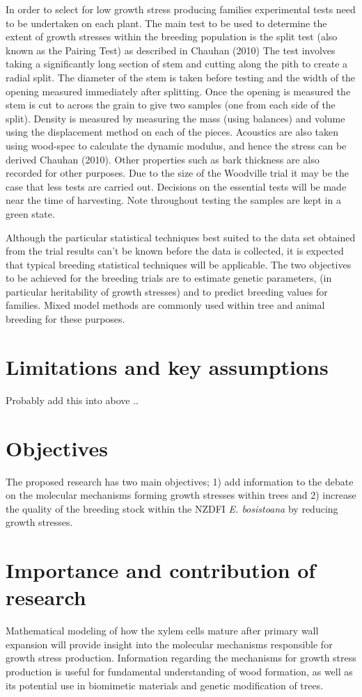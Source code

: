 \documentclass{article}
\begin{document}
In order to select for low growth stress producing families experimental tests
need to be undertaken on each plant. The main test to be used to determine the
extent of growth stresses within the breeding population is the split test (also
known as the Pairing Test) as described in Chauhan (2010) The test involves
taking a significantly long section of stem and cutting along the pith to create
a radial split. The diameter of the stem is taken before testing and the width
of the opening measured immediately after splitting. Once the opening is
measured the stem is cut to across the grain to give two samples (one from each
side of the split). Density is measured by measuring the mass (using balances)
and volume using the displacement method on each of the pieces. Acoustics are
also taken using wood-spec to calculate the dynamic modulus, and hence the
stress can be derived Chauhan (2010). Other properties such as bark thickness
are also recorded for other purposes. Due to the size of the Woodville trial it
may be the case that less tests are carried out. Decisions on the essential
tests will be made near the time of harvesting. Note throughout testing the
samples are kept in a green state.

Although the particular statistical techniques best suited to the data set
obtained from the trial results can’t be known before the data is collected, it
is expected that typical breeding statistical techniques will be applicable. The
two objectives to be achieved for the breeding trials are to estimate genetic
parameters, (in particular heritability of growth stresses) and to predict
breeding values for families. Mixed model methods are commonly used within tree
and animal breeding for these purposes.

\section{Limitations and key assumptions}
Probably add this into above ..

\section{Objectives}
The proposed research has two main objectives; 1) add information to the
debate on the molecular mechanisms forming growth stresses within trees and 2)
increase the quality of the breeding stock within the NZDFI \textit{E.
bosistoana} by reducing growth stresses.

\section{Importance and contribution of research}
Mathematical modeling of how the xylem cells mature after primary
wall expansion will provide insight into the molecular mechanisms
responsible for growth stress production. Information regarding the mechanisms
for growth stress production is useful for fundamental understanding of
wood formation, as well as its potential use in biomimetic materials and
genetic modification of trees.
\end{document}

